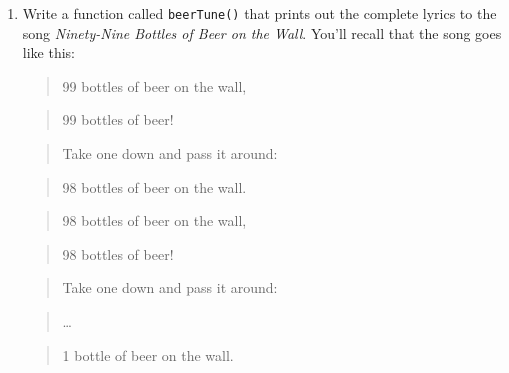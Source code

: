 \documentclass[]{book}
\providecommand{\tightlist}{%
  \setlength{\itemsep}{0pt}\setlength{\parskip}{0pt}}
\theoremstyle{definition}
\theoremstyle{definition}
\theoremstyle{remark}
\begin{document}
{\begin{enumerate}
  Thus when the character is \texttt{*} and \texttt{n} is 5, the output
  would look like this:

\begin{verbatim}
## *
## **
## ***
## ****
## *****
## ****
## ***
## **
## *
\end{verbatim}

  The function should take two arguments:

  \begin{itemize}
  \tightlist
  \item
    \texttt{char}: the character to repeat. The default value should be
    \texttt{"*"}.
  \item
    \texttt{n}: the number of characters in the longest, middle line.
    The default value should be 3.
  \end{itemize}
\item
  Write a function called \texttt{beerTune()} that prints out the
  complete lyrics to the song \emph{Ninety-Nine Bottles of Beer on the
  Wall}. You'll recall that the song goes like this:

  \begin{quote}
  99 bottles of beer on the wall,
  \end{quote}

  \begin{quote}
  99 bottles of beer!
  \end{quote}

  \begin{quote}
  Take one down and pass it around:
  \end{quote}

  \begin{quote}
  98 bottles of beer on the wall.
  \end{quote}

  \begin{quote}
  98 bottles of beer on the wall,
  \end{quote}

  \begin{quote}
  98 bottles of beer!
  \end{quote}

  \begin{quote}
  Take one down and pass it around:
  \end{quote}

  \begin{quote}
  \ldots{}
  \end{quote}

  \begin{quote}
  1 bottle of beer on the wall.
  \end{quote}


\end{enumerate}}
\end{document}
